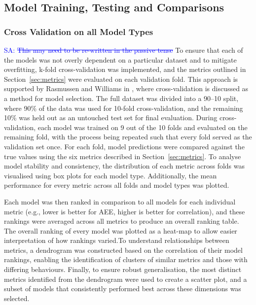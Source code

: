 \documentclass[12pt]{article}
\newcommand{\Sarp}[1]{{\textcolor{blue}{{SA: #1}} }}
\begin{document}
\subsection{Model Training, Testing and Comparisons}
%
%
\subsubsection{Cross Validation on all Model Types}
\Sarp{\sout{This may need to be re-written in the passive tense}}
To ensure that each of the models was not overly dependent on a particular dataset and to mitigate overfitting, 
k-fold cross-validation was implemented, and the metrics outlined in Section~\ref{sec:metrics} were evaluated on each validation fold. 
This approach is supported by Rasmussen and Williams in \cite[Ch.5]{bible}, where cross-validation is discussed as a method for model selection.
The full dataset was divided into a 90--10 split, where 90\% of the data was used for 10-fold cross-validation, and the remaining 10\% was held out 
as an untouched test set for final evaluation. During cross-validation, each model was trained on 9 out of the 10 folds and evaluated on the remaining fold, 
with the process being repeated such that every fold served as the validation set once. For each fold, model predictions were compared against the true values using the six metrics
described in Section~\ref{sec:metrics}.
To analyse model stability and consistency, the distribution of each metric across folds was visualised using box plots for each model type. Additionally, the mean performance for every metric 
across all folds and model types was plotted.

Each model was then ranked in comparison to all models for each individual metric (e.g., lower is better for AEE, higher is better for correlation), 
and these rankings were averaged across all metrics to produce an overall ranking table. The overall ranking of every model was plotted as a heat-map to allow easier interpretation
of how rankings varied.To understand relationships between metrics, a dendrogram was constructed based on the correlation of their model rankings, 
enabling the identification of clusters of similar metrics and those with differing behaviours. 
Finally, to ensure robust generalisation, the most distinct metrics identified from the dendrogram were used to 
create a scatter plot, and a subset of models that consistently performed best across these dimensions was selected.
\end{document}
